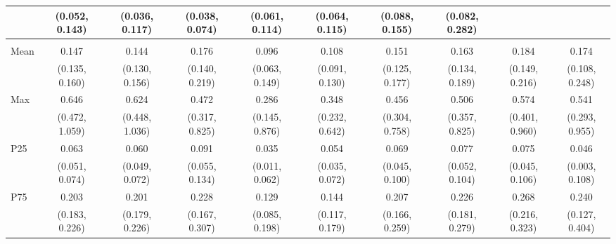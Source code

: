 {\begin{tabular}{l|c|c|c|c|c|c|c|c|c}
& {\scriptsize (0.052, 0.143)}
& {\scriptsize (0.036, 0.117)}
& {\scriptsize (0.038, 0.074)}
& {\scriptsize (0.061, 0.114)}
& {\scriptsize (0.064, 0.115)}
& {\scriptsize (0.088, 0.155)}
& {\scriptsize (0.082, 0.282)}
\\ [0.1cm]
\hline
\noalign{\smallskip}
\multicolumn{10}{l}{\textbf{Effect with Leads and Lags}} \\
\noalign{\smallskip}
\hline
Mean
& 0.147 & 0.144 & 0.176 & 0.096 & 0.108 & 0.151 & 0.163 & 0.184 & 0.174 \\
& {\scriptsize (0.135, 0.160)}
& {\scriptsize (0.130, 0.156)}
& {\scriptsize (0.140, 0.219)}
& {\scriptsize (0.063, 0.149)}
& {\scriptsize (0.091, 0.130)}
& {\scriptsize (0.125, 0.177)}
& {\scriptsize (0.134, 0.189)}
& {\scriptsize (0.149, 0.216)}
& {\scriptsize (0.108, 0.248)}
\\ [0.1cm]
\hline
Max
& 0.646 & 0.624 & 0.472 & 0.286 & 0.348 & 0.456 & 0.506 & 0.574 & 0.541 \\
& {\scriptsize (0.472, 1.059)}
& {\scriptsize (0.448, 1.036)}
& {\scriptsize (0.317, 0.825)}
& {\scriptsize (0.145, 0.876)}
& {\scriptsize (0.232, 0.642)}
& {\scriptsize (0.304, 0.758)}
& {\scriptsize (0.357, 0.825)}
& {\scriptsize (0.401, 0.960)}
& {\scriptsize (0.293, 0.955)}
\\ [0.1cm]
\hline
P25
& 0.063 & 0.060 & 0.091 & 0.035 & 0.054 & 0.069 & 0.077 & 0.075 & 0.046 \\
& {\scriptsize (0.051, 0.074)}
& {\scriptsize (0.049, 0.072)}
& {\scriptsize (0.055, 0.134)}
& {\scriptsize (0.011, 0.062)}
& {\scriptsize (0.035, 0.072)}
& {\scriptsize (0.045, 0.100)}
& {\scriptsize (0.052, 0.104)}
& {\scriptsize (0.045, 0.106)}
& {\scriptsize (0.003, 0.108)}
\\ [0.1cm]
\hline
P75
& 0.203 & 0.201 & 0.228 & 0.129 & 0.144 & 0.207 & 0.226 & 0.268 & 0.240 \\
& {\scriptsize (0.183, 0.226)}
& {\scriptsize (0.179, 0.226)}
& {\scriptsize (0.167, 0.307)}
& {\scriptsize (0.085, 0.198)}
& {\scriptsize (0.117, 0.179)}
& {\scriptsize (0.166, 0.259)}
& {\scriptsize (0.181, 0.279)}
& {\scriptsize (0.216, 0.323)}
& {\scriptsize (0.127, 0.404)}
\\ [0.1cm]
\hline
\hline
\end{tabular}
}

